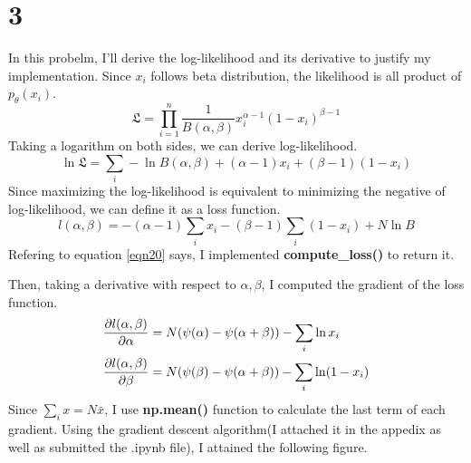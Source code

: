 \documentclass[10pt]{article}
\begin{document}
\section*{3}
In this probelm, I'll derive the log-likelihood and its derivative to justify my implementation.
Since $x_i$ follows beta distribution, the likelihood is all product of $p_\theta(x_i)$.
\begin{equation}
    \mathfrak{L} = \prod_{i = 1}^n \frac{1}{B(\alpha,\beta)} x_i^{\alpha-1}(1-x_i)^{\beta-1}
\end{equation}
Taking a logarithm on both sides, we can derive log-likelihood.
\begin{equation}
    \ln \mathfrak{L} = \sum_i -\ln B(\alpha, \beta) + (\alpha-1)x_i + (\beta-1)(1-x_i)
\end{equation}
Since maximizing the log-likelihood is equivalent to minimizing the negative of log-likelihood, we can define it as a loss function.
\begin{equation}
    l(\alpha, \beta) = -(\alpha-1)\sum_i x_i - (\beta - 1) \sum_i(1-x_i) + N\ln B
    \label{eqn20}
\end{equation}
Refering to equation \ref{eqn20} says, I implemented \textbf{compute\_loss()} to return it. 

Then, taking a derivative with respect to $\alpha, \beta$, I computed the gradient of the loss function.
\begin{align}
    {\partial l(\alpha, \beta)\over \partial \alpha} &= N (\psi(\alpha) - \psi(\alpha + \beta)) - \sum_i \ln x_i \\
    {\partial l(\alpha, \beta)\over \partial \beta} &= N (\psi(\beta) - \psi(\alpha + \beta)) - \sum_i \ln (1-x_i)
\end{align}
Since $\sum_i x  = N\bar{x}$, I use \textbf{np.mean()} function to calculate the last term of each gradient.
Using the gradient descent algorithm(I attached it in the appedix as well as submitted the .ipynb file), I attained the following figure. 
\end{document}
